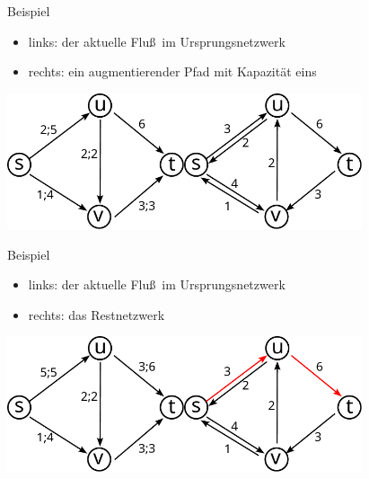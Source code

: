 \documentclass[aspectratio=1610, 11pt]{beamer}
\begin{document}
\begin{frame}
\begin{overprint}
\begin{exampleblock}{Beispiel}
			\begin{itemize}
				\item links: der aktuelle Flu\ss\ im Ursprungsnetzwerk
				\item rechts: ein augmentierender Pfad mit Kapazit\"at eins
			\end{itemize}
		\end{exampleblock}
		\includegraphics[height=40mm]{./images/flow9.pdf}\hfill\includegraphics[height=40mm]{./images/flow10.pdf}
\begin{exampleblock}{Beispiel}
			\begin{itemize}
				\item links: der aktuelle Flu\ss\ im Ursprungsnetzwerk
				\item rechts: das Restnetzwerk
			\end{itemize}
		\end{exampleblock}
		\includegraphics[height=40mm]{./images/flow12.pdf}\hfill\includegraphics[height=40mm]{./images/flow11.pdf}

\end{overprint}
\end{frame}
\end{document}
